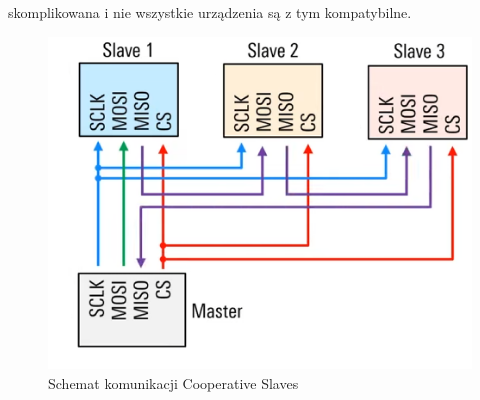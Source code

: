 \documentclass[11pt]{article}
\begin{document}
\begin{enumerate}
{        skomplikowana i nie wszystkie urządzenia są z tym kompatybilne.
        \begin{figure}[H]
            \includegraphics[width=\textwidth]{SPI_cooperative_slaves.png}
            \caption{Schemat komunikacji Cooperative Slaves}
        \end{figure}
    } 
\end{enumerate}
\end{document}
